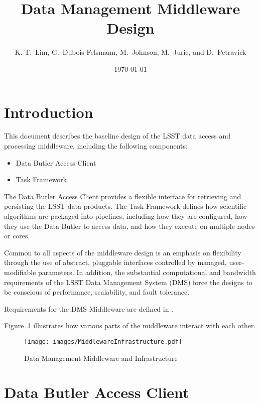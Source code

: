 \documentclass[DM,lsstdraft,toc]{lsstdoc}
\title{Data Management Middleware Design}
\author{
	K.-T.~Lim,
	G.~Dubois-Felsmann,
	M.~Johnson,
	M.~Juric,
	and
	D.~Petravick
}
\date{\today}
\begin{document}
\maketitle

\section{Introduction}\label{introduction}

This document describes the baseline design of the LSST data access and
processing middleware, including the following components:

\begin{itemize}
	\item Data Butler Access Client
	\item Task Framework
\end{itemize}

The Data Butler
Access Client provides a flexible interface for retrieving and persisting the LSST
data products.  The Task Framework defines how scientific algorithms are
packaged into pipelines, including how they are configured, how they use the
Data Butler to access data, and how they execute on multiple nodes or cores.

Common to all aspects of the middleware design is an emphasis on
flexibility through the use of abstract, pluggable interfaces controlled
by managed, user-modifiable parameters. In addition, the substantial
computational and bandwidth requirements of the LSST Data Management
System (DMS) force the designs to be conscious of performance,
scalability, and fault tolerance.

Requirements for the DMS Middleware are defined in .

Figure~\ref{fig:mwandinfra} illustrates how various parts of the middleware
interact with each other.

\begin{figure}
\centering
\texttt{[image: images/MiddlewareInfrastructure.pdf]}
\caption{Data Management Middleware and Infrastructure}
\label{fig:mwandinfra}
\end{figure}


\section{Data Butler Access Client}\label{data-butler-access-client}
\end{document}
